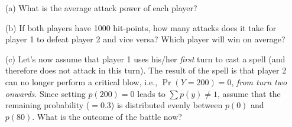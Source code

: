 \documentclass[]{report}
\begin{document}
\begin{itemize}
\item[(a)] What is the average attack power of each player?  \item[(b)] If both players have 1000 hit-points, how many attacks does it take for player 1 to defeat player 2 and vice versa? Which player will win on average?  \item[(c)] Let's now assume that player 1 uses his/her \emph{first} turn to cast a spell (and therefore does not attack in this turn). The result of the spell is that player 2 can no longer perform a critical blow, i.e., $\Pr(Y=200) = 0$, \emph{from turn two onwards}. Since setting $p(200) = 0$ leads to $\sum p(y) \ne 1$, assume that the remaining probability ($= 0.3$) is distributed evenly between $p(0)$ and $p(80)$. What is the outcome of the battle now?
\end{itemize}
\end{document}
